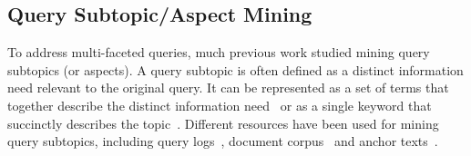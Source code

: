 \subsection{Query Subtopic/Aspect Mining}
To address multi-faceted queries, much previous work studied mining query subtopics (or aspects). 
A query subtopic is often defined as a distinct information need relevant to the original query.
It can be represented as a set of terms that together describe the distinct information need~\cite{wang2009mining,wu2011identifying, dang2011inferring} or as a single keyword that succinctly describes the topic~\cite{song2011overview}. 
Different resources have been used for mining query subtopics, including query logs~\cite{wang2007learn,hu2012mining,xue2011topic,wang2009mining,wu2011identifying,yin2010building}, document corpus~\cite{allan2002using} and anchor texts~\cite{dang2011inferring}.



